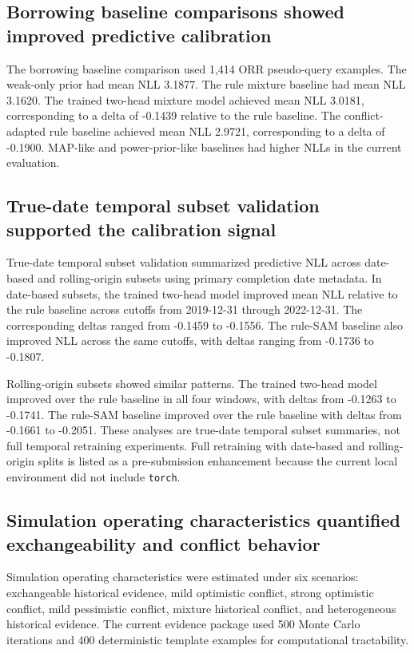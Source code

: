 \documentclass[11pt]{article}
\begin{document}
\subsection{Borrowing baseline comparisons showed improved predictive calibration}

The borrowing baseline comparison used 1,414 ORR pseudo-query examples. The weak-only prior had mean NLL 3.1877. The rule mixture baseline had mean NLL 3.1620. The trained two-head mixture model achieved mean NLL 3.0181, corresponding to a delta of -0.1439 relative to the rule baseline. The conflict-adapted rule baseline achieved mean NLL 2.9721, corresponding to a delta of -0.1900. MAP-like and power-prior-like baselines had higher NLLs in the current evaluation.

\subsection{True-date temporal subset validation supported the calibration signal}

True-date temporal subset validation summarized predictive NLL across date-based and rolling-origin subsets using primary completion date metadata. In date-based subsets, the trained two-head model improved mean NLL relative to the rule baseline across cutoffs from 2019-12-31 through 2022-12-31. The corresponding deltas ranged from -0.1459 to -0.1556. The rule-SAM baseline also improved NLL across the same cutoffs, with deltas ranging from -0.1736 to -0.1807.

Rolling-origin subsets showed similar patterns. The trained two-head model improved over the rule baseline in all four windows, with deltas from -0.1263 to -0.1741. The rule-SAM baseline improved over the rule baseline with deltas from -0.1661 to -0.2051. These analyses are true-date temporal subset summaries, not full temporal retraining experiments. Full retraining with date-based and rolling-origin splits is listed as a pre-submission enhancement because the current local environment did not include \texttt{torch}.

\subsection{Simulation operating characteristics quantified exchangeability and conflict behavior}

Simulation operating characteristics were estimated under six scenarios: exchangeable historical evidence, mild optimistic conflict, strong optimistic conflict, mild pessimistic conflict, mixture historical conflict, and heterogeneous historical evidence. The current evidence package used 500 Monte Carlo iterations and 400 deterministic template examples for computational tractability.
\end{document}
